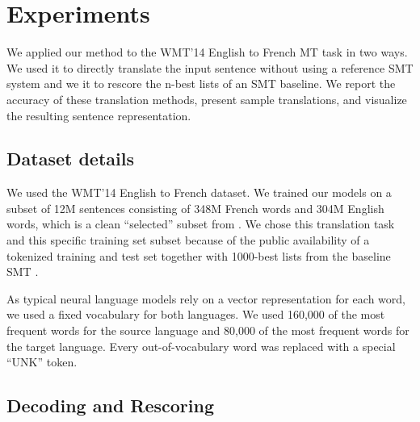 \documentclass{article} \usepackage{nips14submit_e}
\begin{document}
 
\section{Experiments}
\label{sec:experiments}
 
We applied our method to the WMT'14 English to French MT task in two
ways.  We used it to directly translate the input sentence without
using a reference SMT system and we it to rescore the n-best lists of
an SMT baseline.  We report the accuracy of these translation methods,
present sample translations, and visualize the resulting sentence
representation.

\subsection{Dataset details}

We used the WMT'14 English to French dataset.  We trained our models
on a subset of 12M sentences consisting of 348M French words and 304M
English words, which is a clean ``selected'' subset from
\cite{wmt14_en_fr}. We chose this translation task and this specific
training set subset because of the public availability of a tokenized training and
test set together with 1000-best lists from the baseline SMT 
\cite{wmt14_en_fr}.

As typical neural language models rely on a vector representation for
each word, we used a fixed vocabulary for both languages.  We used
160,000 of the most frequent words for the source language and 80,000
of the most frequent words for the target language.  Every
out-of-vocabulary word was replaced with a special ``UNK'' token.  
 







\subsection{Decoding and Rescoring}
\end{document}
